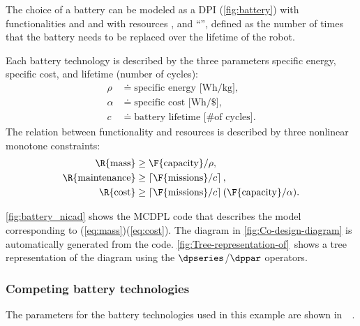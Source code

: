The choice of a battery can be modeled as a DPI (\cref{fig:battery})
with functionalities  and 
and with resources ,  and ``'',
defined as the number of times that the battery needs to be replaced
over the lifetime of the robot. 

Each battery technology is described by the three parameters specific
energy, specific cost, and lifetime (number of cycles):
\begin{align*}
\rho & \doteq\text{specific energy [Wh/kg]},\\
\alpha & \doteq\text{specific cost [Wh/\$]},\\
c & \doteq\text{battery lifetime [\# of cycles]}.
\end{align*}
The relation between functionality and resources is described by three
nonlinear monotone constraints: 
\begin{align}
\R{\text{mass}} & \geq\F{\text{capacity}}/\rho,\label{eq:mass}\\
\R{\text{maintenance}} & \geq\left\lceil \F{\text{missions}}/c\right\rceil ,\label{eq:maintenance}\\
\R{\text{cost}} & \geq\left\lceil \F{\text{missions}}/c\right\rceil (\F{\text{capacity}}/\alpha).\label{eq:cost}
\end{align}

\cref{fig:battery_nicad} shows the MCDPL code that describes the
model corresponding to (\ref{eq:mass})\textendash (\ref{eq:cost}).
The diagram in \cref{fig:Co-design-diagram} is automatically generated
from the code. \cref{fig:Tree-representation-of}~shows a tree representation
of the diagram using the $\dpseries$/$\dppar$ operators. 

\subsubsection{Competing battery technologies}

The parameters for the battery technologies used in this example are
shown in~~. 

